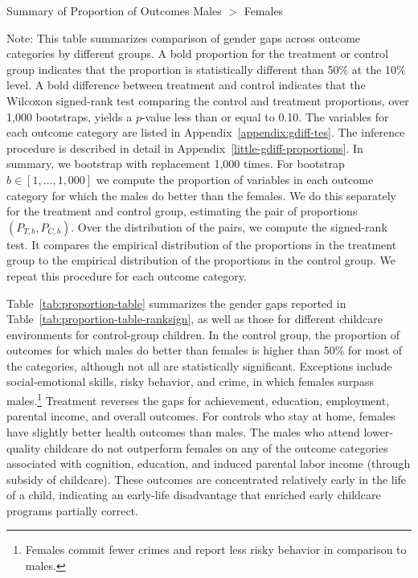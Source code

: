 \begin{table}[H]
\centering
\caption{Summary of Proportion of Outcomes Males $>$ Females}
\label{tab:proportion-table-ranksign}
\begin{threeparttable}

\begin{tablenotes}
\footnotesize
\item Note: This table summarizes comparison of gender gaps across outcome categories by different groups. A bold proportion for the treatment or control group indicates that the proportion is statistically different than 50\% at the 10\% level. A bold difference between treatment and control indicates that the Wilcoxon signed-rank test comparing the control and treatment proportions, over 1,000 bootstraps, yields a $p$-value less than or equal to 0.10. The variables for each outcome category are listed in Appendix~\ref{appendix:gdiff-tes}. The inference procedure is described in detail in Appendix~\ref{little-gdiff-proportions}. In summary, we bootstrap with replacement 1,000 times. For bootstrap $b \in [1, \ldots, 1,000]$ we compute the proportion of variables in each outcome category for which the males do better than the females. We do this separately for the treatment and control group, estimating the pair of proportions $(P_{T,b}, P_{C,b})$. Over the distribution of the pairs, we compute the signed-rank test. It compares the empirical distribution of the proportions in the treatment group to the empirical distribution of the proportions in the control group. We repeat this procedure for each outcome category.
\end{tablenotes}
\end{threeparttable}
\end{table}

Table~\ref{tab:proportion-table} summarizes the gender gaps reported in Table~\ref{tab:proportion-table-ranksign}, as well as those for different childcare environments for control-group children. In the control group, the proportion of outcomes for which males do better than females is higher than 50\% for most of the categories, although not all are statistically significant. Exceptions include social-emotional skills, risky behavior, and crime, in which females surpass males.\footnote{Females commit fewer crimes and report less risky behavior in comparison to males.} Treatment reverses the gaps for achievement, education, employment, parental income, and overall outcomes. For controls who stay at home, females have slightly better health outcomes than males. The males who attend lower-quality childcare do not outperform females on any of the outcome categories associated with cognition, education, and induced parental labor income (through subsidy of childcare). These outcomes are concentrated relatively early in the life of a child, indicating an early-life disadvantage that enriched early childcare programs partially correct.


